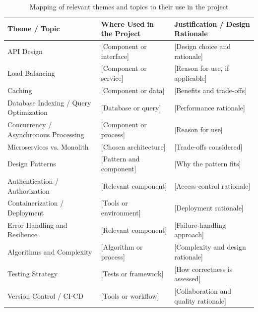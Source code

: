 \documentclass[manuscript,screen,review]{acmart}
\begin{document}
\begin{table}[t]
  \caption{Mapping of relevant themes and topics to their use in the project}
  \label{tab:csd-themes}
  \footnotesize
  \setlength{\tabcolsep}{5pt}
  \renewcommand{\arraystretch}{1.25}

  \begin{tabularx}{\textwidth}{@{}
    p{}
    p{}
    X
    @{}}
    \toprule
    \textbf{Theme / Topic} &
    \textbf{Where Used in the Project} &
    \textbf{Justification / Design Rationale} \\
    \midrule

    API Design &
    [Component or interface] &
    [Design choice and rationale] \\

    Load Balancing &
    [Component or service] &
    [Reason for use, if applicable] \\

    Caching &
    [Component or data] &
    [Benefits and trade-offs] \\

    Database Indexing / Query Optimization &
    [Database or query] &
    [Performance rationale] \\

    Concurrency / Asynchronous Processing &
    [Component or process] &
    [Reason for use] \\

    Microservices vs. Monolith &
    [Chosen architecture] &
    [Trade-offs considered] \\

    Design Patterns &
    [Pattern and component] &
    [Why the pattern fits] \\

    Authentication / Authorization &
    [Relevant component] &
    [Access-control rationale] \\

    Containerization / Deployment &
    [Tools or environment] &
    [Deployment rationale] \\

    Error Handling and Resilience &
    [Relevant component] &
    [Failure-handling approach] \\

    Algorithms and Complexity &
    [Algorithm or process] &
    [Complexity and design rationale] \\

    Testing Strategy &
    [Tests or framework] &
    [How correctness is assessed] \\

    Version Control / CI-CD &
    [Tools or workflow] &
    [Collaboration and quality rationale] \\

    \bottomrule
  \end{tabularx}
\end{table}
\end{document}
